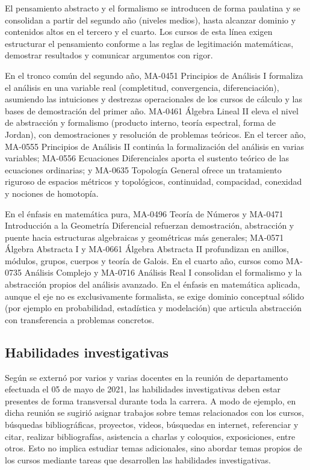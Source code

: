 \begin{refsection}
El pensamiento abstracto y el formalismo se introducen de forma paulatina y se consolidan a partir del segundo año (niveles medios), hasta alcanzar dominio y contenidos altos en el tercero y el cuarto. Los cursos de esta línea exigen estructurar el pensamiento conforme a las reglas de legitimación matemáticas, demostrar resultados y comunicar argumentos con rigor.

En el tronco común del segundo año, MA-0451 Principios de Análisis I formaliza el análisis en una variable real (completitud, convergencia, diferenciación), asumiendo las intuiciones y destrezas operacionales de los cursos de cálculo y las bases de demostración del primer año. MA-0461 Álgebra Lineal II eleva el nivel de abstracción y formalismo (producto interno, teoría espectral, forma de Jordan), con demostraciones y resolución de problemas teóricos. En el tercer año, MA-0555 Principios de Análisis II continúa la formalización del análisis en varias variables; MA-0556 Ecuaciones Diferenciales aporta el sustento teórico de las ecuaciones ordinarias; y MA-0635 Topología General ofrece un tratamiento riguroso de espacios métricos y topológicos, continuidad, compacidad, conexidad y nociones de homotopía.

En el énfasis en matemática pura, MA-0496 Teoría de Números y MA-0471 Introducción a la Geometría Diferencial refuerzan demostración, abstracción y puente hacia estructuras algebraicas y geométricas más generales; MA-0571 Álgebra Abstracta I y MA-0661 Álgebra Abstracta II profundizan en anillos, módulos, grupos, cuerpos y teoría de Galois. En el cuarto año, cursos como MA-0735 Análisis Complejo y MA-0716 Análisis Real I consolidan el formalismo y la abstracción propios del análisis avanzado. En el énfasis en matemática aplicada, aunque el eje no es exclusivamente formalista, se exige dominio conceptual sólido (por ejemplo en probabilidad, estadística y modelación) que articula abstracción con transferencia a problemas concretos.

\subsection{Habilidades investigativas}

Según se externó por varios y varias docentes en la reunión de departamento efectuada el 05 de mayo de 2021, las habilidades investigativas deben estar presentes de forma transversal durante toda la carrera. A modo de ejemplo, en dicha reunión se sugirió asignar trabajos sobre temas relacionados con los cursos, búsquedas bibliográficas, proyectos, videos, búsquedas en internet, referenciar y citar, realizar bibliografías, asistencia a charlas y coloquios, exposiciones, entre otros. Esto no implica estudiar temas adicionales, sino abordar temas propios de los cursos mediante tareas que desarrollen las habilidades investigativas.


\end{refsection}
